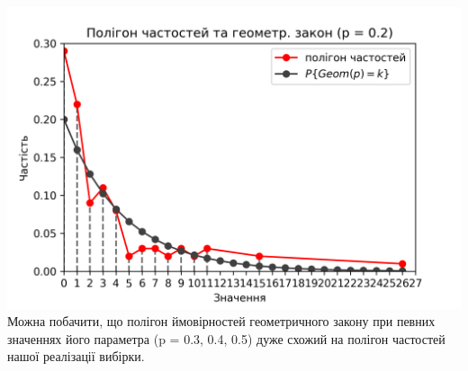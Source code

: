 \documentclass{article}
\begin{document}
\newline
\includegraphics[scale = 0.8]{plot4}
\newline
Можна побачити, що полігон ймовірностей геометричного 
закону при певних значеннях його параметра (p = 0.3, 0.4, 0.5) 
дуже схожий на полігон частостей нашої реалізації вибірки.
\newpage
\end{document}
